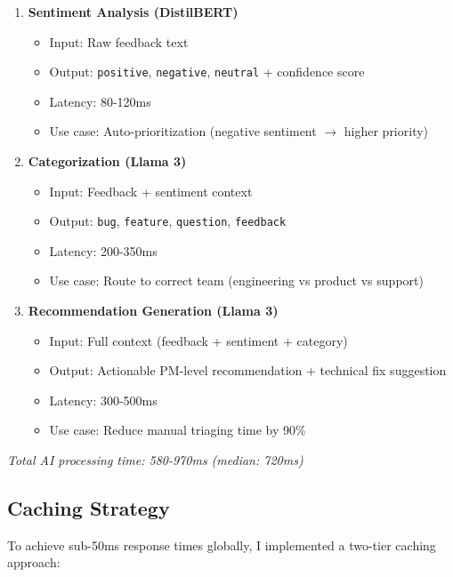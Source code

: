 \documentclass[11pt,a4paper]{article}
\begin{document}
\begin{enumerate}[leftmargin=*, itemsep=0.8em]
    \item \textbf{Sentiment Analysis (DistilBERT)}
    \begin{itemize}
        \item Input: Raw feedback text
        \item Output: \texttt{positive}, \texttt{negative}, \texttt{neutral} + confidence score
        \item Latency: 80-120ms
        \item Use case: Auto-prioritization (negative sentiment $\rightarrow$ higher priority)
    \end{itemize}
    
    \item \textbf{Categorization (Llama 3)}
    \begin{itemize}
        \item Input: Feedback + sentiment context
        \item Output: \texttt{bug}, \texttt{feature}, \texttt{question}, \texttt{feedback}
        \item Latency: 200-350ms
        \item Use case: Route to correct team (engineering vs product vs support)
    \end{itemize}
    
    \item \textbf{Recommendation Generation (Llama 3)}
    \begin{itemize}
        \item Input: Full context (feedback + sentiment + category)
        \item Output: Actionable PM-level recommendation + technical fix suggestion
        \item Latency: 300-500ms
        \item Use case: Reduce manual triaging time by 90\%
    \end{itemize}
\end{enumerate}

\textit{Total AI processing time: 580-970ms (median: 720ms)}

\subsection{Caching Strategy}

To achieve sub-50ms response times globally, I implemented a two-tier caching approach:
\end{document}

